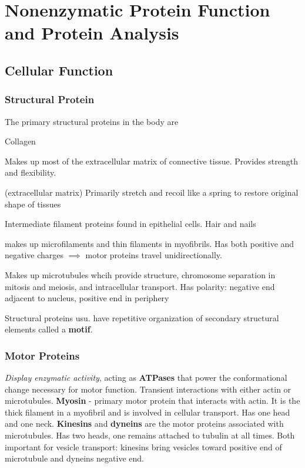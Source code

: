 \documentclass[../Bio_chemistryReview.tex]{subfiles}
\begin{document}
	\chapter{Nonenzymatic Protein Function and Protein Analysis\supdag}
	
	\section{Cellular Function\supdag}
	
	\subsection{Structural Protein\supdag}
	
	The primary structural proteins in the body are \begin{labeling}{Collagen}
		\item [\textbf{Collagen}]  Makes up most of the extracellular matrix of connective tissue. Provides strength and flexibility.
		\item [\textbf{Elastin}] (extracellular matrix) Primarily stretch and recoil like a spring to restore original shape of tissues
		\item [\textbf{Keratin}] Intermediate filament proteins found in epithelial cells. Hair and nails
		\item [\textbf{Actin}] makes up microfilaments and thin filaments in myofibrils. Has both positive and negative charges $ \implies $ motor proteins travel unidirectionally.
		\item [\textbf{Tubulin}] Makes up microtubules whcih provide structure, chromosome separation in mitosis and meiosis, and intracellular transport. Has polarity: negative end adjacent to nucleus, positive end in periphery
	\end{labeling}
	
	Structural proteins usu. have repetitive organization of secondary structural elements called a \textbf{motif}.
	
	\subsection{Motor Proteins\supdag}
	
	\emph{Display enzymatic activity}, acting as \textbf{ATPases} that power the conformational change necessary for motor function. Transient interactions with either actin or microtubules. \textbf{Myosin} - primary motor protein that interacts with actin. It is the thick filament in a myofibril and is involved in cellular transport. Has one head and one neck. \textbf{Kinesins} and \textbf{dyneins} are the motor proteins associated with microtubules. Has two heads, one remains attached to tubulin at all times. Both important for vesicle transport: kinesins bring vesicles toward positive end of microtubule and dyneins negative end. 
	
\end{document}
